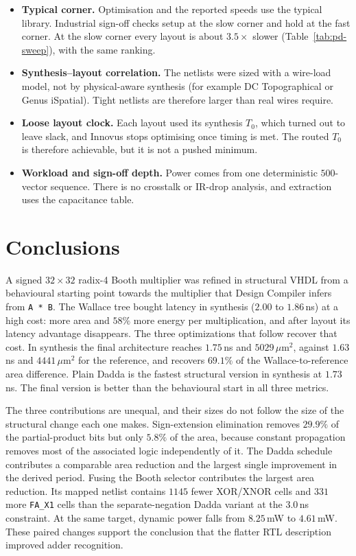 \documentclass[11pt,a4paper]{article}
\newcommand{\umarea}{\ensuremath{\,\mu\mathrm{m}^{2}}}
\begin{document}
\begin{itemize}\itemsep2pt
\item \textbf{Typical corner.} Optimisation and the reported speeds use the
      typical library. Industrial sign-off checks setup at the slow corner
      and hold at the fast corner. At the slow corner every layout is about
      $3.5\times$ slower (Table~\ref{tab:pd-sweep}), with the same ranking.
\item \textbf{Synthesis--layout correlation.} The netlists were sized with a
      wire-load model, not by physical-aware synthesis (for example DC
      Topographical or Genus iSpatial). Tight netlists are therefore larger
      than real wires require.
\item \textbf{Loose layout clock.} Each layout used its synthesis $T_0$, which
      turned out to leave slack, and Innovus stops optimising once timing is
      met. The routed $T_0$ is therefore achievable, but it is not a pushed
      minimum.
\item \textbf{Workload and sign-off depth.} Power comes from one
      deterministic $500$-vector sequence. There is no crosstalk or IR-drop
      analysis, and extraction uses the capacitance table.
\end{itemize}

\clearpage
\section{Conclusions}

A signed $32\times32$ radix-4 Booth multiplier was refined in structural VHDL
from a behavioural starting point towards the multiplier that Design Compiler
infers from \texttt{A * B}. The Wallace tree bought latency in synthesis
($2.00$ to $1.86$\,ns) at a high cost: more area and $58\%$ more energy per
multiplication, and after layout its latency advantage disappears. The three
optimizations that follow recover that cost. In synthesis the final
architecture reaches $1.75$\,ns and $5029\umarea$, against $1.63$\,ns and
$4441\umarea$ for the reference, and recovers $69.1\%$ of the
Wallace-to-reference area difference. Plain Dadda is the fastest structural
version in synthesis at $1.73$\,ns. The final version is better than the
behavioural start in all three metrics.

The three contributions are unequal, and their sizes do not follow the size of
the structural change each one makes. Sign-extension elimination removes
$29.9\%$ of the partial-product bits but only $5.8\%$ of the area, because
constant propagation removes most of the associated logic independently of it.
The Dadda schedule contributes a comparable area reduction and the largest
single improvement in the derived period. Fusing the Booth selector contributes
the largest area reduction. Its mapped netlist contains $1145$ fewer XOR/XNOR
cells and $331$ more \texttt{FA\_X1} cells than the separate-negation Dadda
variant at the $3.0$\,ns constraint. At the same target, dynamic power falls
from $8.25$\,mW to $4.61$\,mW. These paired changes support the conclusion
that the flatter RTL description improved adder recognition.
\end{document}
